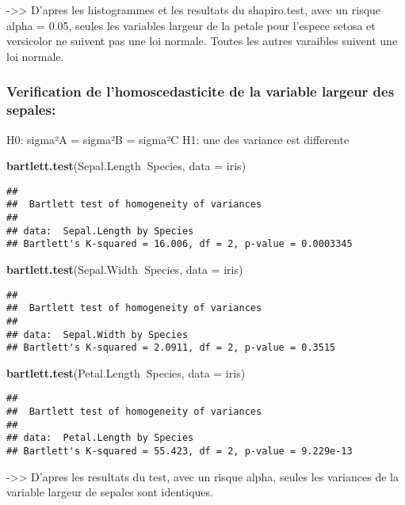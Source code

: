 \documentclass[]{article}
\newenvironment{Shaded}{\begin{snugshade}}{\end{snugshade}}
\newcommand{\KeywordTok}[1]{\textcolor[rgb]{0.13,0.29,0.53}{\textbf{#1}}}
\newcommand{\DataTypeTok}[1]{\textcolor[rgb]{0.13,0.29,0.53}{#1}}
\newcommand{\OperatorTok}[1]{\textcolor[rgb]{0.81,0.36,0.00}{\textbf{#1}}}
\newcommand{\NormalTok}[1]{#1}
\begin{document}
-\textgreater{}\textgreater{} D'apres les histogrammes et les resultats
du shapiro.test, avec un risque alpha = 0.05, seules les variables
largeur de la petale pour l'espece setosa et versicolor ne suivent pas
une loi normale. Toutes les autres varaibles suivent une loi normale.

\subsubsection{Verification de l'homoscedasticite de la variable largeur
des
sepales:}\label{verification-de-lhomoscedasticite-de-la-variable-largeur-des-sepales}

H0: sigma²A = sigma²B = sigma²C H1: une des variance est differente

\begin{Shaded}
\begin{Highlighting}[]
\KeywordTok{bartlett.test}\NormalTok{(Sepal.Length}\OperatorTok{~}\NormalTok{Species, }\DataTypeTok{data =}\NormalTok{ iris)}
\end{Highlighting}
\end{Shaded}

\begin{verbatim}
## 
##  Bartlett test of homogeneity of variances
## 
## data:  Sepal.Length by Species
## Bartlett's K-squared = 16.006, df = 2, p-value = 0.0003345
\end{verbatim}

\begin{Shaded}
\begin{Highlighting}[]
\KeywordTok{bartlett.test}\NormalTok{(Sepal.Width}\OperatorTok{~}\NormalTok{Species, }\DataTypeTok{data =}\NormalTok{ iris)}
\end{Highlighting}
\end{Shaded}

\begin{verbatim}
## 
##  Bartlett test of homogeneity of variances
## 
## data:  Sepal.Width by Species
## Bartlett's K-squared = 2.0911, df = 2, p-value = 0.3515
\end{verbatim}

\begin{Shaded}
\begin{Highlighting}[]
\KeywordTok{bartlett.test}\NormalTok{(Petal.Length}\OperatorTok{~}\NormalTok{Species, }\DataTypeTok{data =}\NormalTok{ iris)}
\end{Highlighting}
\end{Shaded}

\begin{verbatim}
## 
##  Bartlett test of homogeneity of variances
## 
## data:  Petal.Length by Species
## Bartlett's K-squared = 55.423, df = 2, p-value = 9.229e-13
\end{verbatim}

-\textgreater{}\textgreater{} D'apres les resultats du test, avec un
risque alpha, seules les variances de la variable largeur de sepales
sont identiques.
\end{document}
